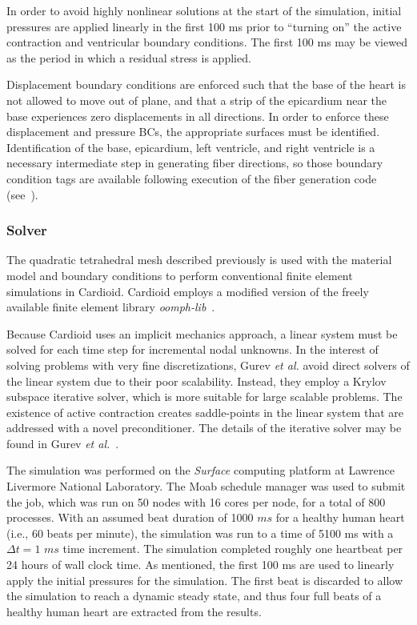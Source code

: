 In order to avoid highly nonlinear solutions at the start of the simulation, initial pressures are applied linearly in the first 100 ms prior to ``turning on'' the active contraction and ventricular boundary conditions. The first 100 ms may be viewed as the period in which a residual stress is applied.

Displacement boundary conditions are enforced such that the base of the heart is not allowed to move out of plane, and that a strip of the epicardium near the base experiences zero displacements in all directions. In order to enforce these displacement and pressure BCs, the appropriate surfaces must be identified. Identification of the base, epicardium, left ventricle, and right ventricle is a necessary intermediate step in generating fiber directions, so those boundary condition tags are available following execution of the fiber generation code (see~).

\subsubsection{Solver}
\label{Solver}

The quadratic tetrahedral mesh described previously is used with the material model and boundary conditions to perform conventional finite element simulations in Cardioid. Cardioid employs a modified version of the freely available finite element library \textit{oomph-lib}~\cite{oomph}.

Because Cardioid uses an implicit mechanics approach, a linear system must be solved for each time step for incremental nodal unknowns. In the interest of solving problems with very fine discretizations, Gurev \textit{et al.} avoid direct solvers of the linear system due to their poor scalability. Instead, they employ a Krylov subspace iterative solver, which is more suitable for large scalable problems. The existence of active contraction creates saddle-points in the linear system that are addressed with a novel preconditioner. The details of the iterative solver may be found in Gurev \textit{et al.}~\cite{gurev_2015}.

The simulation was performed on the \textit{Surface} computing platform at Lawrence Livermore National Laboratory. The Moab schedule manager was used to submit the job, which was run on 50 nodes with 16 cores per node, for a total of 800 processes. With an assumed beat duration of 1000 $ms$ for a healthy human heart (i.e., 60 beats per minute), the simulation was run to a time of 5100 ms with a $\Delta t = 1$ $ms$ time increment. The simulation completed roughly one heartbeat per 24 hours of wall clock time. As mentioned, the first 100 ms are used to linearly apply the initial pressures for the simulation. The first beat is discarded to allow the simulation to reach a dynamic steady state, and thus four full beats of a healthy human heart are extracted from the results.

